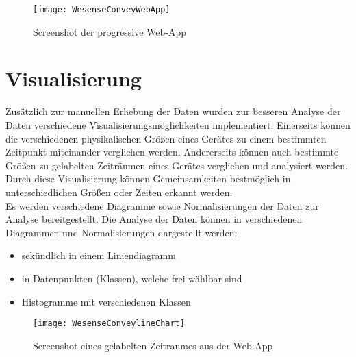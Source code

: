         \begin{figure}[h]
            \centering
            \texttt{[image: WesenseConveyWebApp]}
            \caption{Screenshot der progressive Web-App}
            \label{fig:WebApp1}
        \end{figure}

\section{Visualisierung}\label{VisualisierungWebApp}

        Zusätzlich zur manuellen Erhebung der Daten wurden zur besseren Analyse der Daten verschiedene Visualisierungsmöglichkeiten implementiert.
        Einerseits können die verschiedenen physikalischen Größen eines Gerätes zu einem bestimmten Zeitpunkt miteinander verglichen werden.
        Andererseits können auch bestimmte Größen zu gelabelten Zeiträumen eines Gerätes verglichen und analysiert werden. 
        Durch diese Visualisierung können Gemeinsamkeiten bestmöglich in unterschiedlichen Größen oder Zeiten erkannt werden.\\
        \newline
        Es werden verschiedene Diagramme sowie Normalisierungen der Daten zur Analyse bereitgestellt.
        Die Analyse der Daten können in verschiedenen Diagrammen und Normalisierungen dargestellt werden:
        \begin{itemize}
            \item sekündlich in einem Liniendiagramm
            \item in Datenpunkten (Klassen), welche frei wählbar sind
            \item Histogramme mit verschiedenen Klassen
        \end{itemize}

        \begin{figure}[h]
            \centering
            \texttt{[image: WesenseConveylineChart]}
            \caption{Screenshot eines gelabelten Zeitraumes aus der Web-App}
            \label{fig:WebApp2}
        \end{figure}
